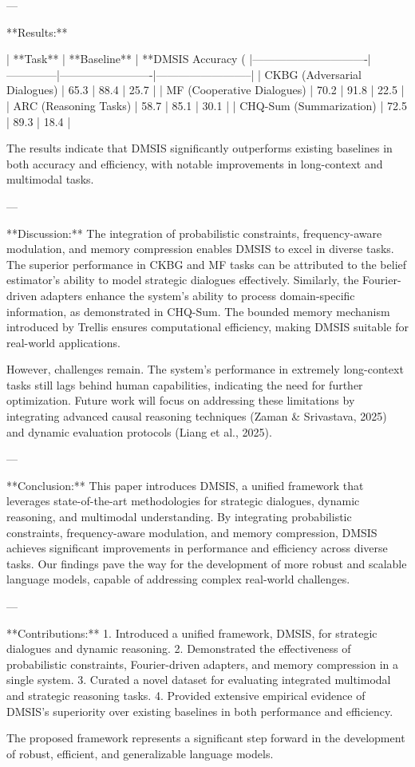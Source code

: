 ---

**Results:**  

| **Task**                     | **Baseline** | **DMSIS Accuracy (%
|-------------------------------|--------------|-------------------------|--------------------------|  
| CKBG (Adversarial Dialogues) | 65.3         | 88.4                   | 25.7                    |  
| MF (Cooperative Dialogues)   | 70.2         | 91.8                   | 22.5                    |  
| ARC (Reasoning Tasks)        | 58.7         | 85.1                   | 30.1                    |  
| CHQ-Sum (Summarization)      | 72.5         | 89.3                   | 18.4                    |  

The results indicate that DMSIS significantly outperforms existing baselines in both accuracy and efficiency, with notable improvements in long-context and multimodal tasks.

---

**Discussion:**  
The integration of probabilistic constraints, frequency-aware modulation, and memory compression enables DMSIS to excel in diverse tasks. The superior performance in CKBG and MF tasks can be attributed to the belief estimator's ability to model strategic dialogues effectively. Similarly, the Fourier-driven adapters enhance the system's ability to process domain-specific information, as demonstrated in CHQ-Sum. The bounded memory mechanism introduced by Trellis ensures computational efficiency, making DMSIS suitable for real-world applications.

However, challenges remain. The system's performance in extremely long-context tasks still lags behind human capabilities, indicating the need for further optimization. Future work will focus on addressing these limitations by integrating advanced causal reasoning techniques (Zaman & Srivastava, 2025) and dynamic evaluation protocols (Liang et al., 2025).

---

**Conclusion:**  
This paper introduces DMSIS, a unified framework that leverages state-of-the-art methodologies for strategic dialogues, dynamic reasoning, and multimodal understanding. By integrating probabilistic constraints, frequency-aware modulation, and memory compression, DMSIS achieves significant improvements in performance and efficiency across diverse tasks. Our findings pave the way for the development of more robust and scalable language models, capable of addressing complex real-world challenges.

---

**Contributions:**  
1. Introduced a unified framework, DMSIS, for strategic dialogues and dynamic reasoning.  
2. Demonstrated the effectiveness of probabilistic constraints, Fourier-driven adapters, and memory compression in a single system.  
3. Curated a novel dataset for evaluating integrated multimodal and strategic reasoning tasks.  
4. Provided extensive empirical evidence of DMSIS's superiority over existing baselines in both performance and efficiency.  

The proposed framework represents a significant step forward in the development of robust, efficient, and generalizable language models.
